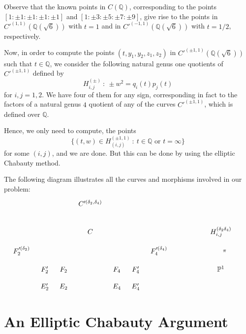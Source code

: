 \documentclass[a4paper,12pt]{amsart}
\theoremstyle{remark}
\theoremstyle{definition}
\begin{document}
Observe that the known points in $C({{\mathbb{Q}}})$, corresponding to the
points $[1:\pm1:\pm1:\pm1:\pm1]$ and $[1:\pm3:\pm5:\pm7:\pm9]$,
give rise to the points in $C'^{( 1,1)}({{\mathbb{Q}}}(\sqrt{6}))$ with $t=1$
and in $C'^{(-1,1)}({{\mathbb{Q}}}(\sqrt{6}))$ with $t=1/2$, respectively.

Now, in order to compute the points $(t,y_1,y_2,z_1,z_2)$ in
$C'^{(\pm 1,1)}({{\mathbb{Q}}}(\sqrt{6}))$ such that $t\in {{\mathbb{Q}}}$, we consider
the following natural genus one quotients of $C'^{(\pm 1,1)}$
defined by
$$H_{i,j}^{(\pm)} \ : \ \pm w^2=q_i(t)p_j(t)$$
for $i,j=1,2$. We have four of them for any sign, corresponding in
fact to the factors of a natural genus $4$ quotient of any of the
curves $C'^{(\pm 1,1)}$, which is defined over ${{\mathbb{Q}}}$.

Hence, we only need to compute, the points
$$\{(t,w) \in H_{(i,j)}^{(\pm 1,1)} \ : \ t\in {{\mathbb{Q}}} \mbox{ or } t=\infty\}$$
for some $(i,j)$, and we are done. But this can be done by using
the elliptic Chabauty method.

 The following diagram illustrates all the curves
and morphisms involved in our problem:
$$
\xymatrix@R=0.7pc@C=0.8pc{
&             &            &      \ar@/_2mm/[dddlll] C'^{(\delta_2,\delta_4)} \ar@{->}[dd]    \ar@/^2mm/[dddrrr]   \ar@/^6mm/[ddrrrrrrr] &           &                           &      &       &     &   & \\
&                             &            &       &           &                           &      &    &        &   \\
&                     &            &   \ar@/_1mm/[ddl]     C      \ar@/^1mm/[ddr]                               &           &                           &   &  & & & H_{i,j}^{(\delta_2\delta_4)} \ar@{->}[dd]^\pi  \\
F_2'^{(\delta_2)}\ar@{~}[dr] &                                           &            &       &           &                          &   \ar@{~}[dl]  F_4'^{(\delta_4)}   &       &        & & \\
& F_2'  \ar@{->}[d] \ar@{->}[r]&  F_2 \ar@{->}[d]   &                                              &  F_4  \ar@{->}[d] &\ar@{->}[l] F_4' \ar@{->}[d] &  &  &  &&  \mathbb{P}^1   & \\
& E_2'  \ar@{->}[r]&  E_2    &                                              &  E_4   &\ar@{->}[l] E_4'  &      &   & & & &
}
$$

\section{An Elliptic Chabauty Argument}
\end{document}
